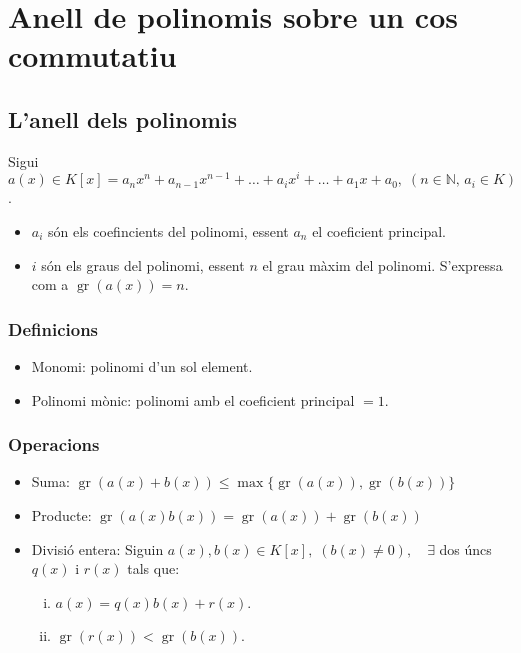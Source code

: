 \section{Anell de polinomis sobre un cos commutatiu}
\subsection{L'anell dels polinomis}
Sigui $a(x) \in K [x] = a_{n}x^{n} + a_{n-1}x^{n-1} + \dots + a_{i}x^{i} + \dots + a_{1}x + a_{0}, \; (n \in \mathbb{N}, \, a_{i} \in K)$.
\begin{itemize}
    \item $a_{i}$ són els coefincients del polinomi, essent $a_{n}$ el coeficient principal.
    \item $i$ són els graus del polinomi, essent $n$ el grau màxim del polinomi. S'expressa com a $\operatorname{gr}(a(x)) = n$.
\end{itemize}
\subsubsection*{Definicions}
\begin{itemize}
    \item Monomi: polinomi d'un sol element.
    \item Polinomi mònic: polinomi amb el coeficient principal $= 1$.
\end{itemize}

\subsubsection*{Operacions}
\begin{itemize}
    \item Suma:
        \subitem $\operatorname{gr}(a(x) + b(x)) \leq \max \{ \operatorname{gr}(a(x)), \operatorname{gr}(b(x)) \}$
    \item Producte:
        \subitem $\operatorname{gr}(a(x) b(x)) = \operatorname{gr}(a(x)) + \operatorname{gr}(b(x))$
    \item Divisió entera:
        \subitem Siguin $a(x), b(x) \in K [x], \; (b(x) \neq 0), \quad \exists$ dos úncs $q(x)$ i $r(x)$ tals que:
        \begin{enumerate}[i)]
            \item $a(x) = q(x) b(x) + r(x)$.
            \item $\operatorname{gr}(r(x)) < \operatorname{gr}(b(x))$.
        \end{enumerate}
\end{itemize}

